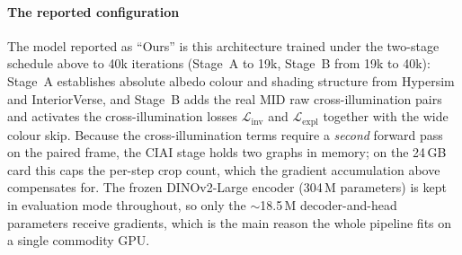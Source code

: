 \paragraph{The reported configuration}
The model reported as ``Ours'' is this architecture trained under the two-stage schedule
above to 40k iterations (Stage~A to 19k, Stage~B from 19k to 40k): Stage~A establishes absolute albedo
colour and shading structure from Hypersim and InteriorVerse, and Stage~B adds
the real MID raw cross-illumination pairs and activates the cross-illumination losses
$\mathcal{L}_{\text{inv}}$ and $\mathcal{L}_{\text{expl}}$ together with the wide
colour skip.
Because the cross-illumination terms require a \emph{second} forward pass on the paired
frame, the CIAI stage holds two graphs in memory; on the 24\,GB card this caps
the per-step crop count, which the gradient accumulation above compensates for.
The frozen DINOv2-Large encoder (304\,M parameters) is kept in evaluation mode
throughout, so only the $\sim$18.5\,M decoder-and-head parameters receive
gradients, which is the main reason the whole pipeline fits on a single commodity GPU.
